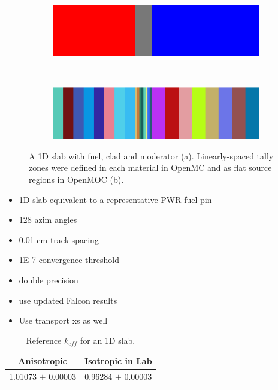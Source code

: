 \begin{figure}[h!]
\begin{subfigure}{\textwidth}
  \centering
  \includegraphics[width=\linewidth]{figures/biases/slab/slab-simple}
  \caption{}
\end{subfigure} \\
\begin{subfigure}{\textwidth}
  \centering
  \includegraphics[width=\linewidth]{figures/biases/slab/slab-8x}
  \caption{}
\end{subfigure}
\caption[1D slab materials and geometry]{A 1D slab with fuel, clad and moderator (a). Linearly-spaced tally zones were defined in each material in OpenMC and as flat source regions in OpenMOC (b).}
\label{fig:chap4-slab}
\end{figure}

\begin{itemize}[noitemsep]
  \item 1D slab equivalent to a representative \ac{PWR} fuel pin
  \item 128 azim angles
  \item 0.01 cm track spacing
  \item 1E-7 convergence threshold
  \item double precision
  \item use updated Falcon results
  \item Use transport xs as well
\end{itemize}

\begin{table}[h!]
  \centering
  \caption{Reference $k_{eff}$ for an 1D slab.}
  \label{table:chap2-slab-reference} 
  \vspace{14pt}
  \begin{tabular}{c c}
  \toprule
  \multicolumn{1}{c}{\bf Anisotropic} &
  \multicolumn{1}{c}{\bf Isotropic in Lab} \\
  \midrule
  1.01073 $\pm$ 0.00003 & 0.96284 $\pm$ 0.00003 \\
  \bottomrule
\end{tabular}
\end{table}

